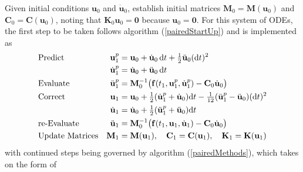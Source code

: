Given initial conditions $\mathbf{u}_0$ and $\dot{\mathbf{u}}_0$, establish initial matrices $\mathbf{M}_0 = \mathbf{M} ( \mathbf{u}_0 )$ and $\mathbf{C}_0 = \mathbf{C} ( \mathbf{u}_0 )$, noting that $\mathbf{K}_0 \mathbf{u}_0 = \mathbf{0}$ because $\mathbf{u}_0 = \mathbf{0}$.  For this system of ODEs, the first step to be taken follows algorithm (\ref{pairedStartUp}) and is implemented as
\begin{subequations}
    \notag
    \begin{align}
    \mbox{} & \text{Predict} & 
    \mathbf{u}_1^p & = \mathbf{u}_0 + \dot{\mathbf{u}}_0 \, \mathrm{d}t +
    \tfrac{1}{2} \ddot{\mathbf{u}}_0 ( \mathrm{d}t )^2 \\
    \mbox{} & &
    \dot{\mathbf{u}}^p_1 & = \dot{\mathbf{u}}_0 + \ddot{\mathbf{u}}_0 \, \mathrm{d}t \\
    \mbox{} & \text{Evaluate} &
    \ddot{\mathbf{u}}^p_1 & = \mathbf{M}^{-1}_0 \bigl( 
    \mathbf{f}(t_{1} , \mathbf{u}_1^p , \dot{\mathbf{u}}_1^p ) - 
    \mathbf{C}_0 \dot{\mathbf{u}}_0 \bigr) \\
    \mbox{} & \text{Correct} &
    \mathbf{u}_1 & = \mathbf{u}_0 + \tfrac{1}{2} 
    ( \dot{\mathbf{u}}^p_1 + \dot{\mathbf{u}}_0 ) \mathrm{d}t -
    \tfrac{1}{12} ( \ddot{\mathbf{u}}^p_1 - \ddot{\mathbf{u}}_0 ) 
    ( \mathrm{d}t )^2 \\
    \mbox{} & &
    \dot{\mathbf{u}}_1 & = \dot{\mathbf{u}}_0 + \tfrac{1}{2}  
    ( \ddot{\mathbf{u}}_1^p + \ddot{\mathbf{u}}_0 ) \mathrm{d}t \\
    \mbox{} & \text{re-Evaluate} &
    \ddot{\mathbf{u}}_1 & = \mathbf{M}^{-1}_0 \bigl( 
    \mathbf{f}( t_1 , \mathbf{u}_1 , \dot{\mathbf{u}}_1 ) - 
    \mathbf{C}_0 \dot{\mathbf{u}}_0 \bigr) \\
    \mbox{} & \text{Update Matrices} & 
    \mathbf{M}_1 & = \mathbf{M} ( \mathbf{u}_1 ) , \quad
    \mathbf{C}_1 = \mathbf{C} ( \mathbf{u}_1 ) , \quad
    \mathbf{K}_1 = \mathbf{K} ( \mathbf{u}_1 )
    \end{align}
\end{subequations}
with continued steps being governed by algorithm (\ref{pairedMethods}), which takes on the form of
